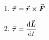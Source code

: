 

\vspace*{\fill}
\centering

\begin{enumerate}
    \item $\va*{\tau} = \va*{r} \cross \va*{F}$ 
    \item $\displaystyle \va*{\tau} = \dv{\va*{L}}{t}$
\end{enumerate}

\centering
\vspace*{\fill}

